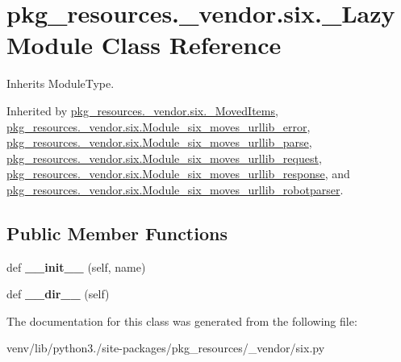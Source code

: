 \hypertarget{classpkg__resources_1_1__vendor_1_1six_1_1___lazy_module}{}\section{pkg\+\_\+resources.\+\_\+vendor.\+six.\+\_\+\+Lazy\+Module Class Reference}
\label{classpkg__resources_1_1__vendor_1_1six_1_1___lazy_module}


Inherits Module\+Type.



Inherited by \hyperlink{classpkg__resources_1_1__vendor_1_1six_1_1___moved_items}{pkg\+\_\+resources.\+\_\+vendor.\+six.\+\_\+\+Moved\+Items}, \hyperlink{classpkg__resources_1_1__vendor_1_1six_1_1_module__six__moves__urllib__error}{pkg\+\_\+resources.\+\_\+vendor.\+six.\+Module\+\_\+six\+\_\+moves\+\_\+urllib\+\_\+error}, \hyperlink{classpkg__resources_1_1__vendor_1_1six_1_1_module__six__moves__urllib__parse}{pkg\+\_\+resources.\+\_\+vendor.\+six.\+Module\+\_\+six\+\_\+moves\+\_\+urllib\+\_\+parse}, \hyperlink{classpkg__resources_1_1__vendor_1_1six_1_1_module__six__moves__urllib__request}{pkg\+\_\+resources.\+\_\+vendor.\+six.\+Module\+\_\+six\+\_\+moves\+\_\+urllib\+\_\+request}, \hyperlink{classpkg__resources_1_1__vendor_1_1six_1_1_module__six__moves__urllib__response}{pkg\+\_\+resources.\+\_\+vendor.\+six.\+Module\+\_\+six\+\_\+moves\+\_\+urllib\+\_\+response}, and \hyperlink{classpkg__resources_1_1__vendor_1_1six_1_1_module__six__moves__urllib__robotparser}{pkg\+\_\+resources.\+\_\+vendor.\+six.\+Module\+\_\+six\+\_\+moves\+\_\+urllib\+\_\+robotparser}.

\subsection*{Public Member Functions}
\begin{DoxyCompactItemize}
\item 
\mbox{\label{classpkg__resources_1_1__vendor_1_1six_1_1___lazy_module_ae09eb058a521bb0a67f766b55db4fb8a}} 
def {\bfseries \+\_\+\+\_\+init\+\_\+\+\_\+} (self, name)
\item 
\mbox{\label{classpkg__resources_1_1__vendor_1_1six_1_1___lazy_module_a17c474d0ebe6b905ea19dd212a3dd666}} 
def {\bfseries \+\_\+\+\_\+dir\+\_\+\+\_\+} (self)
\end{DoxyCompactItemize}


The documentation for this class was generated from the following file\+:\begin{DoxyCompactItemize}
\item 
venv/lib/python3./site-\/packages/pkg\+\_\+resources/\+\_\+vendor/six.\+py\end{DoxyCompactItemize}
